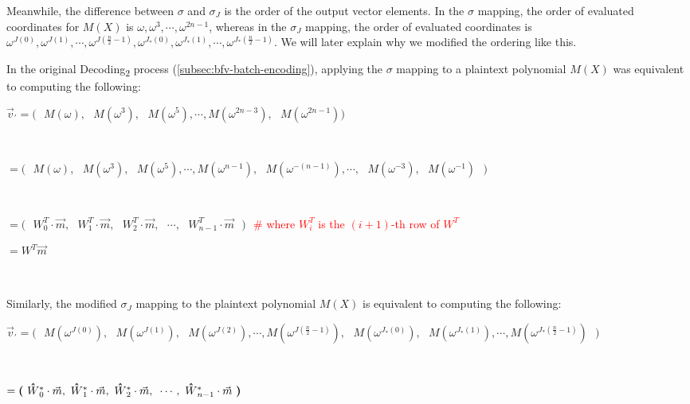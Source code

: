 Meanwhile, the difference between $\sigma$ and $\sigma_J$ is the order of the output vector elements. In the $\sigma$ mapping, the order of evaluated coordinates for $M(X)$ is $\omega, \omega^3, \cdots, \omega^{2n - 1}$, whereas in the $\sigma_J$ mapping, the order of evaluated coordinates is $\omega^{J(0)}, \omega^{J(1)}, \cdots, \omega^{J(\frac{n}{2} - 1)}, \omega^{J_*(0)}, \omega^{J_*(1)}, \cdots, \omega^{J_*(\frac{n}{2} - 1)}$. We will later explain why we modified the ordering like this. 

In the original \textsf{Decoding\textsubscript{2}} process (\autoref{subsec:bfv-batch-encoding}), applying the $\sigma$ mapping to a plaintext polynomial $M(X)$ was equivalent to computing the following: 

$\vec{v}_{'} = \bm{(} \text{ } M(\omega), \text{ } M(\omega^3), \text{ } M(\omega^5), \cdots, M(\omega^{2n-3}), \text{ } M(\omega^{2n-1}) \bm{)}$ 

$ $

$ = \bm{(} \text{ } M(\omega), \text{ } M(\omega^3), \text{ } M(\omega^5), \cdots, M(\omega^{n-1}), \text{ } M(\omega^{-(n-1)}), \cdots, \text{ } M(\omega^{-3}), \text{ } M(\omega^{-1}) \text{ } \bm{)}$ 

$ $

$= \bm{(} \text{ } W^T_0\cdot \vec{m}, \text{ } W^T_1\cdot \vec{m}, \text{ } W^T_2\cdot \vec{m}, \text{ } \cdots, \text{ } W^T_{n-1}\cdot \vec{m} \text{ } \bm{)} $ 
$ $ \textcolor{red}{ \# where $W_i^T$ is the $(i+1)$-th row of $W^T$}

$ = W^T \vec{m} $




$ $

Similarly, the modified $\sigma_J$ mapping to the plaintext polynomial $M(X)$ is equivalent to computing the following:

$\vec{v}_{'} =  \bm{(} \text{ } 
M(\omega^{J(0)}), \text{ } M(\omega^{J(1)}), \text{ } M(\omega^{J(2)}), \cdots,  M(\omega^{J(\frac{n}{2}-1)}), \text{ } M(\omega^{J_*(0)}), \text{ } M(\omega^{J_*(1)}), \cdots,  M(\omega^{J_*(\frac{n}{2}-1)}) \text{ } \bm{)}$


$ $

$= \bm{(} \text{ } \hathat{W}^*_0\cdot \vec{m}, \text{ } \hathat{W}^*_1\cdot \vec{m}, \text{ } \hathat{W}^*_2\cdot \vec{m}, \text{ } \cdots, \text{ } \hathat{W}^*_{n-1}\cdot \vec{m} \text{ } \bm{)} $ 


